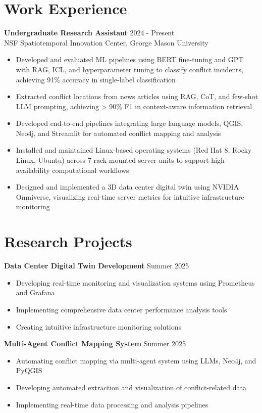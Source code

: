 \documentclass[11pt,a4paper]{article}
\begin{document}
\section*{Work Experience}
\textbf{Undergraduate Research Assistant} \hfill 2024 - Present\\
NSF Spatiotemporal Innovation Center, George Mason University
\begin{itemize}[leftmargin=*]
    \item Developed and evaluated ML pipelines using BERT fine-tuning and GPT with RAG, ICL, and hyperparameter tuning to classify conflict incidents, achieving 91\% accuracy in single-label classification
    \item Extracted conflict locations from news articles using RAG, CoT, and few-shot LLM prompting, achieving > 90\% F1 in context-aware information retrieval
    \item Developed end-to-end pipelines integrating large language models, QGIS, Neo4j, and Streamlit for automated conflict mapping and analysis
    \item Installed and maintained Linux-based operating systems (Red Hat 8, Rocky Linux, Ubuntu) across 7 rack-mounted server units to support high-availability computational workflows
    \item Designed and implemented a 3D data center digital twin using NVIDIA Omniverse, visualizing real-time server metrics for intuitive infrastructure monitoring
\end{itemize}

\section*{Research Projects}
\textbf{Data Center Digital Twin Development} \hfill Summer 2025
\begin{itemize}[leftmargin=*]
    \item Developing real-time monitoring and visualization systems using Prometheus and Grafana
    \item Implementing comprehensive data center performance analysis tools
    \item Creating intuitive infrastructure monitoring solutions
\end{itemize}

\textbf{Multi-Agent Conflict Mapping System} \hfill Summer 2025
\begin{itemize}[leftmargin=*]
    \item Automating conflict mapping via multi-agent system using LLMs, Neo4j, and PyQGIS
    \item Developing automated extraction and visualization of conflict-related data
    \item Implementing real-time data processing and analysis pipelines
\end{itemize}
\end{document}
